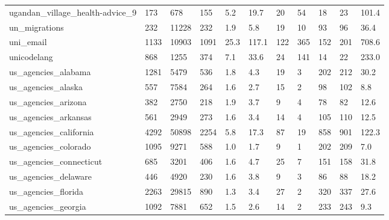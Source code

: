 \begin{longtable}{lllllllllll}
 ugandan\_village\_health-advice\_9                    & 173        & 678       & 155   & 5.2    & 19.7   & 20    & 54     & 18     & 23     & 101.4   \\
 un\_migrations                                      & 232        & 11228     & 232   & 1.9    & 5.8    & 19    & 10     & 93     & 96     & 36.4    \\
 uni\_email                                          & 1133       & 10903     & 1091  & 25.3   & 117.1  & 122   & 365    & 152    & 201    & 708.6   \\
 unicodelang                                        & 868        & 1255      & 374   & 7.1    & 33.6   & 24    & 141    & 14     & 22     & 233.0   \\
 us\_agencies\_alabama                                & 1281       & 5479      & 536   & 1.8    & 4.3    & 19    & 3      & 202    & 212    & 30.2    \\
 us\_agencies\_alaska                                 & 557        & 7584      & 264   & 1.6    & 2.7    & 15    & 2      & 98     & 102    & 8.8     \\
 us\_agencies\_arizona                                & 382        & 2750      & 218   & 1.9    & 3.7    & 9     & 4      & 78     & 82     & 12.6    \\
 us\_agencies\_arkansas                               & 561        & 2949      & 273   & 1.6    & 3.4    & 14    & 4      & 105    & 110    & 12.5    \\
 us\_agencies\_california                             & 4292       & 50898     & 2254  & 5.8    & 17.3   & 87    & 19     & 858    & 901    & 122.3   \\
 us\_agencies\_colorado                               & 1095       & 9271      & 588   & 1.0    & 1.7    & 9     & 1      & 202    & 209    & 7.0     \\
 us\_agencies\_connecticut                            & 685        & 3201      & 406   & 1.6    & 4.7    & 25    & 7      & 151    & 158    & 31.8    \\
 us\_agencies\_delaware                               & 446        & 4920      & 230   & 1.6    & 3.8    & 9     & 3      & 86     & 88     & 18.2    \\
 us\_agencies\_florida                                & 2263       & 29815     & 890   & 1.3    & 3.4    & 27    & 2      & 320    & 337    & 27.6    \\
 us\_agencies\_georgia                                & 1092       & 7881      & 652   & 1.5    & 2.6    & 14    & 2      & 233    & 243    & 9.3     \\

\end{longtable}
